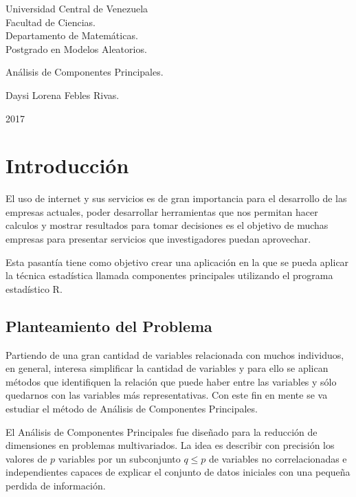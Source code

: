 \documentclass[12pt,letterpaper]{report} %
\begin{document}
\thispagestyle{empty}
\begin{center}
	Universidad Central de Venezuela\\
	Facultad de Ciencias.\\
	Departamento de Matemáticas.\\
	Postgrado en Modelos Aleatorios.\\
	
	\vspace{5cm}
	
	Análisis de Componentes Principales.
	
	\vspace{5cm}
	
	Daysi Lorena Febles Rivas.
	
	\vfill
	
	2017
\end{center}

\newpage

\chapter{Introducción}

El uso de internet y sus servicios es de gran importancia para el desarrollo de las empresas actuales, poder desarrollar herramientas que nos permitan hacer calculos y mostrar resultados para tomar decisiones es el objetivo de muchas empresas para presentar servicios que investigadores puedan aprovechar.

Esta pasantía tiene como objetivo crear una aplicación en la que se pueda aplicar la técnica estadística llamada componentes principales utilizando el programa estadístico R.

\section{Planteamiento del Problema}

Partiendo de una gran cantidad de variables relacionada con muchos individuos, en general, interesa simplificar la cantidad de variables y para ello se aplican métodos que identifiquen la relación que puede haber entre las variables y sólo quedarnos con las variables más representativas. Con este fin en mente se va estudiar el método de Análisis de Componentes Principales.

El Análisis de Componentes Principales fue diseñado para la reducción de dimensiones en problemas multivariados. La idea es describir con precisión los valores de $p$ variables por un subconjunto $q\le p$ de variables no correlacionadas e independientes capaces de explicar el conjunto de datos iniciales con una pequeña perdida de información.
\end{document}
